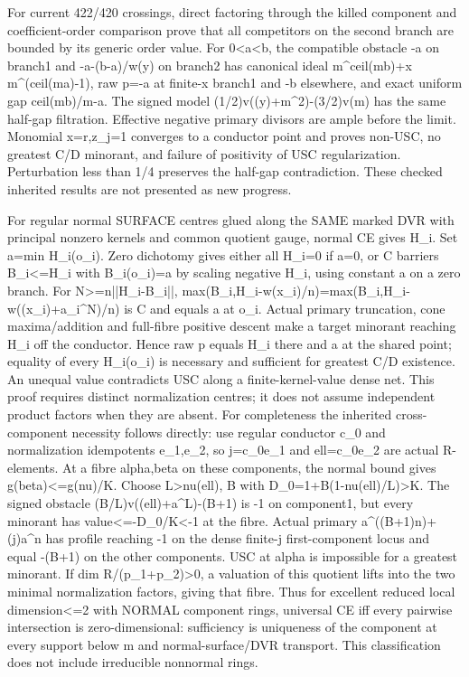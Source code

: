 For current 422/420 crossings, direct factoring through the killed component and coefficient-order comparison prove that all competitors on the second branch are bounded by its generic order value. For 0\textless{}a\textless{}b, the compatible obstacle -a on branch1 and -a-(b-a)/w(y) on branch2 has canonical ideal m\textasciicircum{}ceil(mb)+x m\textasciicircum{}(ceil(ma)-1), raw p=-a at finite-x branch1 and -b elsewhere, and exact uniform gap ceil(mb)/m-a. The signed model (1/2)v((y)+m\textasciicircum{}2)-(3/2)v(m) has the same half-gap filtration. Effective negative primary divisors are ample before the limit. Monomial x=r,z\_j=1 converges to a conductor point and proves non-USC, no greatest C/D minorant, and failure of positivity of USC regularization. Perturbation less than 1/4 preserves the half-gap contradiction. These checked inherited results are not presented as new progress.

For regular normal SURFACE centres glued along the SAME marked DVR with principal nonzero kernels and common quotient gauge, normal CE gives H\_i. Set a=min H\_i(o\_i). Zero dichotomy gives either all H\_i=0 if a=0, or C barriers B\_i\textless{}=H\_i with B\_i(o\_i)=a by scaling negative H\_i, using constant a on a zero branch. For N\textgreater{}=n||H\_i-B\_i||, max(B\_i,H\_i-w(x\_i)/n)=max(B\_i,H\_i-w((x\_i)+a\_i\textasciicircum{}N)/n) is C and equals a at o\_i. Actual primary truncation, cone maxima/addition and full-fibre positive descent make a target minorant reaching H\_i off the conductor. Hence raw p equals H\_i there and a at the shared point; equality of every H\_i(o\_i) is necessary and sufficient for greatest C/D existence. An unequal value contradicts USC along a finite-kernel-value dense net. This proof requires distinct normalization centres; it does not assume independent product factors when they are absent. For completeness the inherited cross-component necessity follows directly: use regular conductor c\_0 and normalization idempotents e\_1,e\_2, so j=c\_0e\_1 and ell=c\_0e\_2 are actual R-elements. At a fibre alpha,beta on these components, the normal bound gives g(beta)\textless{}=g(nu)/K. Choose L\textgreater{}nu(ell), B with D\_0=1+B(1-nu(ell)/L)\textgreater{}K. The signed obstacle (B/L)v((ell)+a\textasciicircum{}L)-(B+1) is -1 on component1, but every minorant has value\textless{}=-D\_0/K\textless{}-1 at the fibre. Actual primary a\textasciicircum{}((B+1)n)+(j)a\textasciicircum{}n has profile reaching -1 on the dense finite-j first-component locus and equal -(B+1) on the other components. USC at alpha is impossible for a greatest minorant. If dim R/(p\_1+p\_2)\textgreater{}0, a valuation of this quotient lifts into the two minimal normalization factors, giving that fibre. Thus for excellent reduced local dimension\textless{}=2 with NORMAL component rings, universal CE iff every pairwise intersection is zero-dimensional: sufficiency is uniqueness of the component at every support below m and normal-surface/DVR transport. This classification does not include irreducible nonnormal rings.

